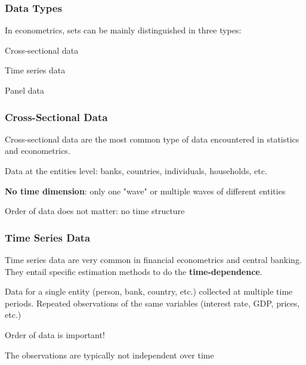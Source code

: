 \documentclass{beamer}
\newenvironment{wideitemize}{\itemize\addtolength{\itemsep}{10pt}}{\enditemize}
\newenvironment{wideenumerate}{\enumerate\addtolength{\itemsep}{10pt}}{\endenumerate}
\begin{document}
\begin{frame}
  \frametitle{Data Types}

  In econometrics, sets can be mainly distinguished in three types:\\
  \medskip
  
  \begin{wideenumerate}
    \item Cross-sectional data
    \item Time series data
    \item Panel data
  \end{wideenumerate}
  
\end{frame}

\begin{frame}
  \frametitle{Cross-Sectional Data}
  Cross-sectional data are the most common type of data encountered in statistics and econometrics.\\
  \medskip

  
  \begin{wideitemize}
    \item Data at the entities level: banks, countries, individuals, households, etc.
    \item \textbf{No time dimension}: only one "wave" or multiple waves of different entities
    \item Order of data does not matter: no time structure
  \end{wideitemize}
\end{frame}


\begin{frame}
  \frametitle{Time Series Data}

  Time series data are very common in financial econometrics and central banking. They entail specific estimation methods to do the \textbf{time-dependence}.\\

  \medskip
  
  \begin{wideitemize}
    \item Data for a single entity (person, bank, country, etc.) collected at multiple time periods. Repeated observations of the same variables (interest rate, GDP, prices, etc.)
    \item Order of data is important!
    \item The observations are typically not independent over time
  \end{wideitemize}  
\end{frame}
\end{document}
